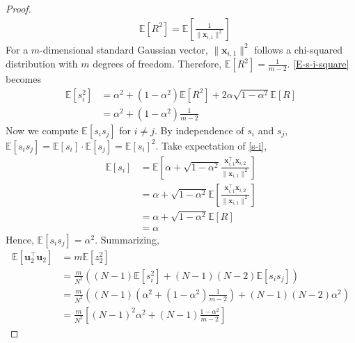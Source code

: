 \documentclass{article}
\theoremstyle{plain}
\theoremstyle{definition}
\theoremstyle{remark}
\begin{document}
\begin{proof}
\begin{align}
   &\mathbb{E}\left[ R^2 \right] = \mathbb{E}\left[ \frac{1}{\| \mathbf{x}_{i,1}\|^2} \right]
\end{align}
For a $m$-dimensional standard Gaussian vector, $\| \mathbf{x}_{i,1}\|^2$ follows a chi-squared distribution with $m$ degrees of freedom. Therefore, $\mathbb{E}\left[ R^2 \right] = \frac{1}{m-2}$. \eqref{E-s-i-square} becomes
\begin{align}
     \mathbb{E}\left[ s_i^2 \right] &= \alpha^2+ (1-\alpha^2) \mathbb{E}\left[ R^2 \right] +2\alpha\sqrt{1-\alpha^2} \mathbb{E}\left[ R \right]\\
     &= \alpha^2 +(1-\alpha^2)\frac{1}{m-2}
\end{align}
Now we compute $\mathbb{E}\left[ s_is_j \right]$ for $i\neq j$. By independence of $s_i$ and $s_j$, $\mathbb{E}\left[ s_is_j \right]= \mathbb{E}\left[ s_i \right] \cdot \mathbb{E}\left[ s_j \right]=\mathbb{E}\left[ s_i \right]^2$. Take expectation of \eqref{s-i}, \begin{align}
    \mathbb{E}\left[ s_i \right] &= \mathbb{E}\left[ \alpha + \sqrt{1-\alpha^2} \frac{\mathbf{x}_{i,1}^\top \mathbf{x}_{i,2}}{\| \mathbf{x}_{i,1}\|^2} \right] \\
    & = \alpha + \sqrt{1-\alpha^2}   \mathbb{E}\left[ \frac{\mathbf{x}_{i,1}^\top \mathbf{x}_{i,2}}{\| \mathbf{x}_{i,1}\|^2} \right] \\
    &= \alpha + \sqrt{1-\alpha^2}   \mathbb{E}\left[ R \right] \\
    & = \alpha \label{expectation-s-i}
\end{align}
Hence, $\mathbb{E}\left[ s_is_j \right]=\alpha^2$. Summarizing,
\begin{align}
\mathbb{E}\left[\mathbf{u}_2^\top \mathbf{u}_2\right] &=m  \mathbb{E}\left[ z_2^2\right]\\
& = \frac{m}{N^2} \left((N-1)\mathbb{E}\left[ s_i^2\right]  + (N-1)(N-2)\mathbb{E}\left[ s_i s_j\right]\right) \\
& = \frac{m}{N^2}\left( (N-1) 
 (\alpha^2 +(1-\alpha^2)\frac{1}{m-2})+(N-1)(N-2)\alpha^2\right) \\
 & = \frac{m}{N^2}\left[ (N-1)^2 \alpha^2 + (N-1)\frac{1-\alpha^2}{m-2}\right] \label{u2-u2}
\end{align}




    

\end{proof}
\end{document}

